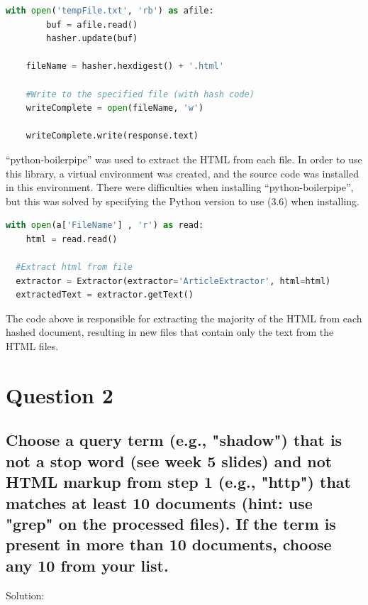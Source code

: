 \documentclass[11pt]{scrartcl} %
\begin{document}
\begin{lstlisting}[language = Python, caption=Make Hashcode]
   with open('tempFile.txt', 'rb') as afile:
        buf = afile.read()
        hasher.update(buf)

    fileName = hasher.hexdigest() + '.html'

    #Write to the specified file (with hash code)
    writeComplete = open(fileName, 'w')

    writeComplete.write(response.text)
\end{lstlisting} \bigskip 

\tabto{2.0cm} ``python-boilerpipe'' was used to extract the HTML from each file. In order to use this library, a virtual environment was created, and the source code was installed in this environment. There were difficulties when installing ``python-boilerpipe'', but this was solved by specifying the Python version to use (3.6) when installing. 

\begin{lstlisting}[language = Python, caption=Extract Text]
with open(a['FileName'] , 'r') as read:
    html = read.read()

  #Extract html from file
  extractor = Extractor(extractor='ArticleExtractor', html=html)
  extractedText = extractor.getText()
\end{lstlisting} \bigskip 

\tabto{2.0cm} The code above is responsible for extracting the majority of the HTML from each hashed document, resulting in new files that contain only the text from the HTML files.

\pagebreak

\section*{Question 2}


\subsection*{Choose a query term (e.g., "shadow") that is not a stop word
(see week 5 slides) and not HTML markup from step 1 (e.g., "http")
that matches at least 10 documents (hint: use "grep" on the processed
files).  If the term is present in more than 10 documents, choose
any 10 from your list.}

\bigskip\bigskip
\LARGE Solution: \newline\newline\small
\end{document}
